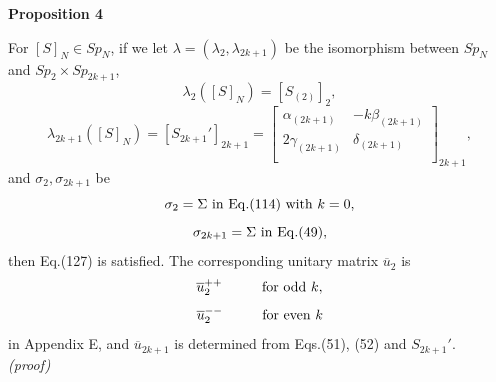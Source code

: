 \documentclass[12pt]{iopart}
\begin{document}
\noindent
{\bf Proposition 4}
\vspace{2mm}

For \([S]_N\in Sp_N\), if we let \(\lambda=(\lambda_2,\lambda_{2k+1})\) be the isomorphism
between \(Sp_N\) and \(Sp_2\times Sp_{2k+1}\),
\begin{equation}
\lambda_2([S]_N)=[S_{(2)}]_2,
\end{equation}
\begin{equation}
\lambda_{2k+1}([S]_N)
=
[S_{2k+1}']_{2k+1}
=
\left[\begin{array}{cc}
\alpha_{(2k+1)} & -k\beta_{(2k+1)} \\
2\gamma_{(2k+1)} & \delta_{(2k+1)} \\
\end{array}\right]_{2k+1},
\end{equation}
and \(\sigma_2, \sigma_{2k+1}\) be
\begin{equation}
\sigma_2=\Sigma{\rm\ in\ Eq.(114)\ with}\ k=0,
\end{equation}
\begin{equation}
\sigma_{2k+1}=\Sigma{\rm\ in\ Eq.(49)},
\end{equation}
then Eq.(127) is satisfied.
The corresponding unitary matrix \(\overline u_2\) is
\begin{equation}
\overline u_2^{++}
\hspace{10mm}
{\rm for\ odd}
\ k,
\end{equation}
\begin{equation}
\overline u_2^{--}
\hspace{10mm}
{\rm for\ even}
\ k
\end{equation}
in Appendix E,
and \(\overline u_{2k+1}\) is determined from 
Eqs.(51), (52)
and \(S_{2k+1}'\).
\\

\noindent
{\it (proof)}
\end{document}
